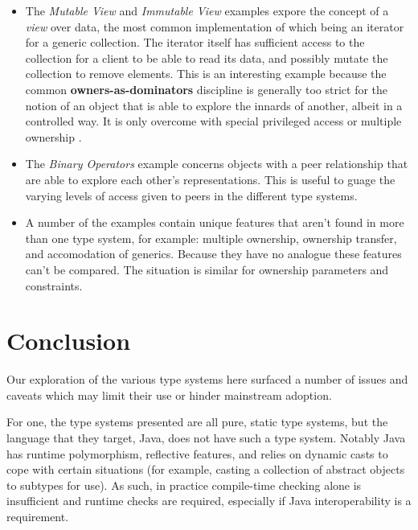 \documentclass{acm_proc_article-sp}
\begin{document}
\begin{itemize}

	\item The \textit{Mutable View} and \textit{Immutable View} examples expore
		the concept of a \textit{view} over data, the most common implementation
		of which being an iterator for a generic collection. The iterator itself
		has sufficient access to the collection for a client to be able to read
		its data, and possibly mutate the collection to remove elements. This is
		an interesting example because the common \textbf{owners-as-dominators}
		discipline is generally too strict for the notion of an object that is
		able to explore the innards of another, albeit in a controlled way. It
		is only overcome with special privileged access
		\cite{boyapati04safejava} or multiple ownership \cite{cameron07mojo}.

    \item The \textit{Binary Operators} example concerns objects with a peer
        \cite{dietl11gut} relationship that are able to explore each other's
        representations. This is useful to guage the varying levels of access
		given to peers in the different type systems.

    \item A number of the examples contain unique features that aren't found in
        more than one type system, for example: multiple ownership, ownership
        transfer, and accomodation of generics. Because they have no analogue
        these features can't be compared. The situation is similar for ownership
		parameters and constraints.

\end{itemize}

\section{Conclusion}
\label{sec:conclude}

Our exploration of the various type systems here surfaced a number of issues and
caveats which may limit their use or hinder mainstream adoption.

For one, the type systems presented are all pure, static type systems, but the
language that they target, Java, does not have such a type system. Notably Java
has runtime polymorphism, reflective features, and relies on dynamic casts to
cope with certain situations (for example, casting a collection of abstract
objects to subtypes for use). As such, in practice compile-time checking alone
is insufficient \cite{boyapati04safejava} and runtime checks are required,
especially if Java interoperability is a requirement.
\end{document}
